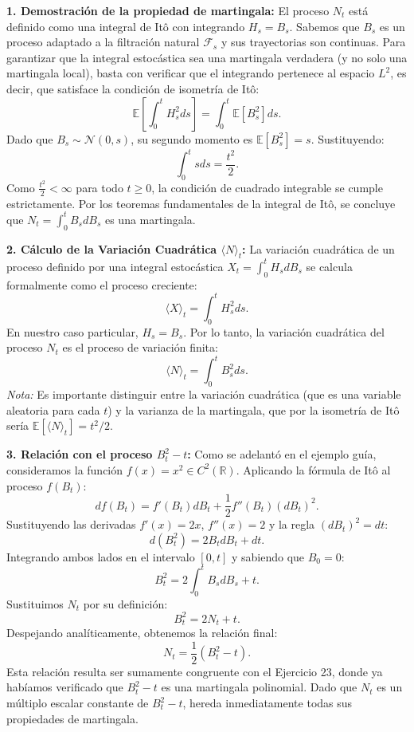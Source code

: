 \documentclass[11pt, letterpaper]{article}
\begin{document}
\begin{solucion}
    \textbf{1. Demostración de la propiedad de martingala:}
    El proceso $N_t$ está definido como una integral de Itô con integrando $H_s = B_s$. Sabemos que $B_s$ es un proceso adaptado a la filtración natural $\mathcal{F}_s$ y sus trayectorias son continuas.
    Para garantizar que la integral estocástica sea una martingala verdadera (y no solo una martingala local), basta con verificar que el integrando pertenece al espacio $L^2$, es decir, que satisface la condición de isometría de Itô:
    \[ \mathbb{E}\left[ \int_0^t H_s^2 ds \right] = \int_0^t \mathbb{E}[B_s^2] ds. \]
    Dado que $B_s \sim \mathcal{N}(0, s)$, su segundo momento es $\mathbb{E}[B_s^2] = s$. Sustituyendo:
    \[ \int_0^t s ds = \frac{t^2}{2}. \]
    Como $\frac{t^2}{2} < \infty$ para todo $t \ge 0$, la condición de cuadrado integrable se cumple estrictamente. Por los teoremas fundamentales de la integral de Itô, se concluye que $N_t = \int_0^t B_s dB_s$ es una martingala.

    \textbf{2. Cálculo de la Variación Cuadrática $\langle N \rangle_t$:}
    La variación cuadrática de un proceso definido por una integral estocástica $X_t = \int_0^t H_s dB_s$ se calcula formalmente como el proceso creciente:
    \[ \langle X \rangle_t = \int_0^t H_s^2 ds. \]
    En nuestro caso particular, $H_s = B_s$. Por lo tanto, la variación cuadrática del proceso $N_t$ es el proceso de variación finita:
    \[ \langle N \rangle_t = \int_0^t B_s^2 ds. \]
    \textit{Nota:} Es importante distinguir entre la variación cuadrática (que es una variable aleatoria para cada $t$) y la varianza de la martingala, que por la isometría de Itô sería $\mathbb{E}[\langle N \rangle_t] = t^2/2$.

    \textbf{3. Relación con el proceso $B_t^2 - t$:}
    Como se adelantó en el ejemplo guía, consideramos la función $f(x) = x^2 \in C^2(\mathbb{R})$.
    Aplicando la fórmula de Itô al proceso $f(B_t)$:
    \[ df(B_t) = f'(B_t) dB_t + \frac{1}{2} f''(B_t) (dB_t)^2. \]
    Sustituyendo las derivadas $f'(x) = 2x$, $f''(x) = 2$ y la regla $(dB_t)^2 = dt$:
    \[ d(B_t^2) = 2B_t dB_t + dt. \]
    Integrando ambos lados en el intervalo $[0, t]$ y sabiendo que $B_0 = 0$:
    \[ B_t^2 = 2 \int_0^t B_s dB_s + t. \]
    Sustituimos $N_t$ por su definición:
    \[ B_t^2 = 2N_t + t. \]
    Despejando analíticamente, obtenemos la relación final:
    \[ N_t = \frac{1}{2}(B_t^2 - t). \]
    Esta relación resulta ser sumamente congruente con el Ejercicio 23, donde ya habíamos verificado que $B_t^2 - t$ es una martingala polinomial. Dado que $N_t$ es un múltiplo escalar constante de $B_t^2 - t$, hereda inmediatamente todas sus propiedades de martingala.
\end{solucion}
\end{document}
